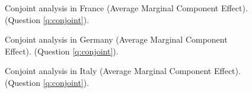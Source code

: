 \begin{figure}[h!]
    \caption[Conjoint analysis in France]{Conjoint analysis in France (Average Marginal Component Effect). (Question \ref{q:conjoint}).
    }\label{fig:conjoint_FR}
\end{figure}

\begin{figure}[h!]
    \caption[Conjoint analysis in Germany]{Conjoint analysis in Germany (Average Marginal Component Effect). (Question \ref{q:conjoint}).
    }\label{fig:conjoint_DE}
\end{figure}

\begin{figure}[h!]
    \caption[Conjoint analysis in Italy]{Conjoint analysis in Italy (Average Marginal Component Effect). (Question \ref{q:conjoint}).
    }\label{fig:conjoint_IT}
\end{figure}

